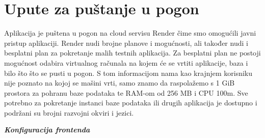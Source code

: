 			\eject 
		
		\section{Upute za puštanje u pogon}
		
			Aplikacija je puštena u pogon na cloud servisu Render čime smo omogućili javni pristup aplikaciji. Render nudi brojne planove i mogućnosti, ali također nudi i besplatni plan za pokretanje malih testnih aplikacija. Za besplatni plan ne postoji mogućnost odabira virtualnog računala na kojem će se vrtiti aplikacije, baza i bilo što što se pusti u pogon. S tom informacijom nama kao krajnjem korisniku nije poznato na kojoj se mašini vrti, samo znamo da raspolažemo s 1 GiB prostora za pohranu baze podataka te RAM-om od 256 MB i CPU 100m. Sve potrebno za pokretanje instanci baze podataka ili drugih aplikacija je dostupno i podržani su brojni razvojni okviri i jezici.
			
			\break
			
			\textbf{\textit{Konfiguracija frontenda}}
			
